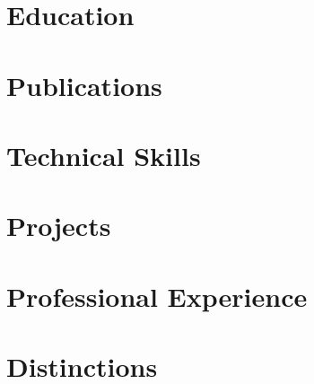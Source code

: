 \documentclass[letter,10pt]{article}
\begin{document}


\section{Education}


\section{Publications}


\section{Technical Skills}


 \section{Projects}


\section{Professional Experience}


\section{Distinctions}


%
\end{document}
